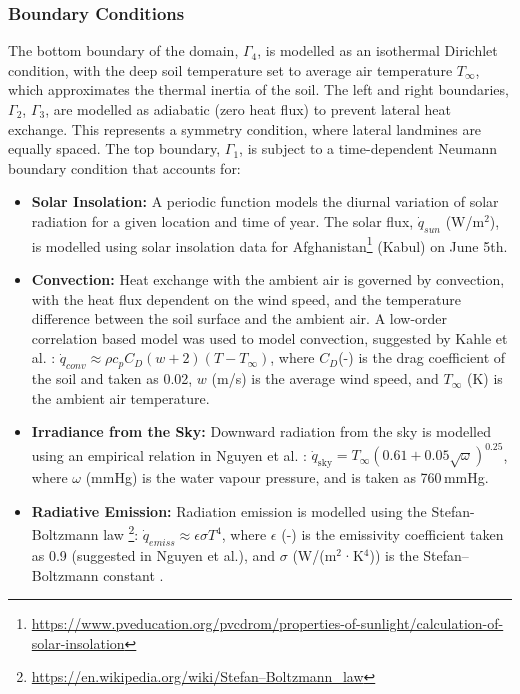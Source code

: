     \subsubsection{Boundary Conditions} 
    
        The bottom boundary of the domain, $\Gamma_4$, is modelled as an isothermal Dirichlet condition, with the deep soil temperature set to average air temperature $T_{\infty}$, which approximates the thermal inertia of the soil. The left and right boundaries, $\Gamma_2$, $\Gamma_3$,  are modelled as adiabatic (zero heat flux) to prevent lateral heat exchange. This represents a symmetry condition, where lateral landmines are equally spaced. The top boundary, $\Gamma_1$,  is subject to a time-dependent Neumann boundary condition that accounts for:
    
        \begin{itemize}
        
            \item \textbf{Solar Insolation:} A periodic function models the diurnal variation of solar radiation for a given location and time of year. The solar flux,  $\dot{q}_{sun}$  (W/m$^2$), is modelled using solar insolation data for Afghanistan\footnote{\url{https://www.pveducation.org/pvcdrom/properties-of-sunlight/calculation-of-solar-insolation}} (Kabul) on June 5th.
            
            \item \textbf{Convection:} Heat exchange with the ambient air is governed by convection, with the heat flux dependent on the wind speed, and the temperature difference between the soil surface and the ambient air. A low-order correlation based model was used to model convection, suggested by Kahle et al. \cite{kahle1997model}: $\dot{q}_{conv} \approx \rho c_p C_D(w+2)(T - T_{\infty})$, where \(C_D\)(-) is the drag coefficient of the soil and taken as 0.02, \(w\) (m/s) is the average wind speed, and \(T_\infty\) (K) is the ambient air temperature.
            
            \item \textbf{Irradiance from the Sky:} Downward radiation from the sky is modelled using an empirical relation in Nguyen et al. \cite{nguyen2008inverse}: $\dot{q}_{\text{sky}} = T_{\infty} \left( 0.61 + 0.05 \sqrt{\omega} \right)^{0.25}$, where \(\omega\) (mmHg) is the water vapour pressure, and is taken as 760\,mmHg.
            
            \item \textbf{Radiative Emission:} Radiation emission is modelled using the Stefan-Boltzmann law \footnote{\url{https://en.wikipedia.org/wiki/Stefan–Boltzmann_law}}: $\dot{q}_{emiss} \approx \epsilon \sigma T^4$, where \(\epsilon\) (-) is the emissivity coefficient taken as 0.9 (suggested in Nguyen et al.), and \(\sigma\) (W/(m$^2$·K$^4$)) is the Stefan–Boltzmann constant .
            
        \end{itemize}
    
